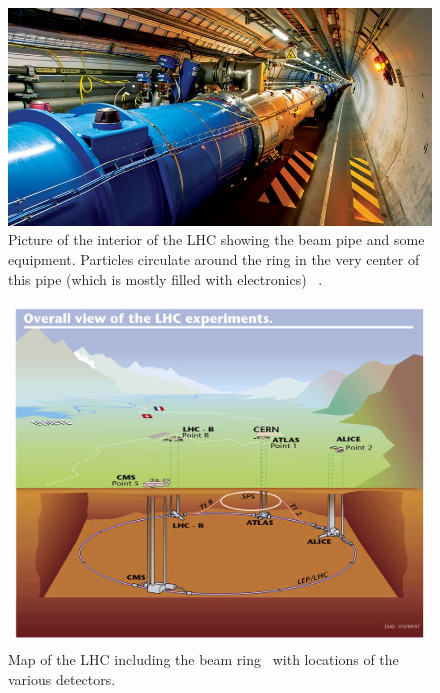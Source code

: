 	
			\begin{figure}[h]
\begin{center}
\includegraphics[width=0.8\linewidth]{Figs/lhc_beampipe.jpg}
\caption{\label{fig:lhc_beampipe}
Picture of the interior of the LHC showing the beam pipe and some equipment. Particles circulate around the ring in the very center of this pipe (which is mostly filled with electronics) ~\cite{cernlhc}.
}
\end{center}
\end{figure} 
			

\begin{figure}[h]
\begin{center}
\includegraphics[width=0.8\linewidth]{Figs/lhclayout.jpg}
\caption{\label{fig:lhclayout}
Map of the LHC including the beam ring~\cite{lhclayout} with locations of the various detectors.
}
\end{center}
\end{figure} 
	
	
